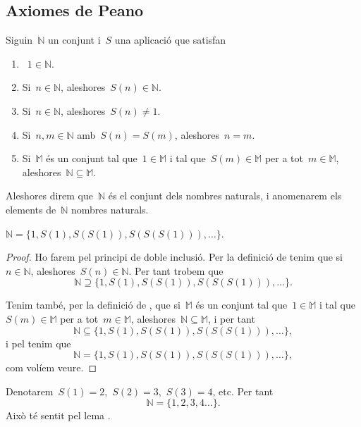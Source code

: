 \documentclass[../../main.tex]{subfiles}
\begin{document}
    \subsection{Axiomes de Peano}
    \begin{definition}
        \label{def:nombres naturals}
        Siguin~\(\mathbb{N}\) un conjunt i~\(S\) una aplicació que satisfan
        \begin{enumerate}
            \item~\(1\in\mathbb{N}\).
            \item Si~\(n\in\mathbb{N}\), aleshores~\(S(n)\in\mathbb{N}\).
            \item Si~\(n\in\mathbb{N}\), aleshores~\(S(n)\neq1\).
            \item Si~\(n,m\in\mathbb{N}\) amb~\(S(n)=S(m)\), aleshores~\(n=m\).
            \item Si~\(\mathbb{M}\) és un conjunt tal que~\(1\in\mathbb{M}\) i tal que~\(S(m)\in\mathbb{M}\) per a tot~\(m\in\mathbb{M}\), aleshores~\(\mathbb{N}\subseteq\mathbb{M}\).
        \end{enumerate}
        Aleshores direm que~\(\mathbb{N}\) és el conjunt dels nombres naturals, i anomenarem els elements de~\(\mathbb{N}\) nombres naturals.
    \end{definition}
    \begin{lemma}
        \label{lema:primer element}
        \(\mathbb{N}=\{1,S(1),S(S(1)),S(S(S(1))),\dots\}\).
    \end{lemma}
    \begin{proof}
        Ho farem pel principi de doble inclusió.
        Per la definició de  tenim que si~\(n\in\mathbb{N}\), aleshores~\(S(n)\in\mathbb{N}\).
        Per tant trobem que
        \[
            \mathbb{N}\supseteq\{1,S(1),S(S(1)),S(S(S(1))),\dots\}.
        \]

        Tenim també, per la definició de , que si~\(\mathbb{M}\) és un conjunt tal que~\(1\in\mathbb{M}\) i tal que~\(S(m)\in\mathbb{M}\) per a tot~\(m\in\mathbb{M}\), aleshores~\(\mathbb{N}\subseteq\mathbb{M}\), i per tant
        \[
            \mathbb{N}\subseteq\{1,S(1),S(S(1)),S(S(S(1))),\dots\},
        \]
        i pel  tenim que
        \[
            \mathbb{N}=\{1,S(1),S(S(1)),S(S(S(1))),\dots\},
        \]
        com volíem veure.
    \end{proof}
    \begin{notation}
        Denotarem~\(S(1)=2\),~\(S(2)=3\),~\(S(3)=4\), etc.
        Per tant
        \[
            \mathbb{N}=\{1,2,3,4\dots\}.
        \]
        Això té sentit pel lema .
    \end{notation}
\end{document}
